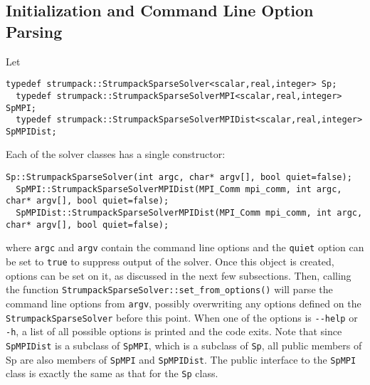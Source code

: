 \documentclass{article}
\begin{document}
\subsection{Initialization and Command Line Option Parsing}\label{sec:initsolver}
Let
\begin{lstlisting}[style=C]
  typedef strumpack::StrumpackSparseSolver<scalar,real,integer> Sp;
  typedef strumpack::StrumpackSparseSolverMPI<scalar,real,integer> SpMPI;
  typedef strumpack::StrumpackSparseSolverMPIDist<scalar,real,integer> SpMPIDist;
\end{lstlisting}
Each of the solver classes has a single constructor:
\begin{lstlisting}[style=C]
  Sp::StrumpackSparseSolver(int argc, char* argv[], bool quiet=false);
  SpMPI::StrumpackSparseSolverMPIDist(MPI_Comm mpi_comm, int argc, char* argv[], bool quiet=false);
  SpMPIDist::StrumpackSparseSolverMPIDist(MPI_Comm mpi_comm, int argc, char* argv[], bool quiet=false);
\end{lstlisting}
where \lstinline[style=C]!argc! and \lstinline[style=C]!argv! contain
the command line options and the \lstinline[style=C]!quiet! option can
be set to \lstinline[style=C]!true! to suppress output of the
solver. Once this object is created, options can be set on it, as
discussed in the next few subsections. Then, calling the function
\lstinline[style=C]!StrumpackSparseSolver::set_from_options()!  will
parse the command line options from \lstinline[style=C]!argv!,
possibly overwriting any options defined on the
\lstinline[style=C]!StrumpackSparseSolver! before this point. When one
of the options is \lstinline[style=Bash]!--help! or
\lstinline[style=Bash]!-h!, a list of all possible options is printed
and the code exits. Note that since \lstinline[style=C]!SpMPIDist! is
a subclass of \lstinline[style=C]!SpMPI!, which is a subclass of
\lstinline[style=C]!Sp!, all public members of Sp are also members of
\lstinline[style=C]!SpMPI! and \lstinline[style=C]!SpMPIDist!. The
public interface to the \lstinline[style=C]!SpMPI! class is exactly
the same as that for the \lstinline[style=C]!Sp! class.
\end{document}

